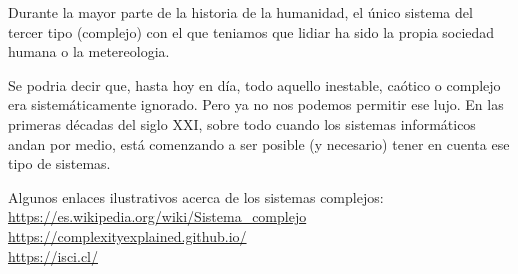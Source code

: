 \documentclass[10pt,a4paper]{article}
\begin{document}
Durante la mayor parte de la historia de la humanidad, el único sistema del tercer tipo (complejo) con el que teniamos que lidiar ha sido la propia sociedad humana o la metereologia. 

Se podria decir que, hasta hoy en día, todo aquello inestable, caótico o complejo era sistemáticamente ignorado. Pero ya no nos podemos permitir ese lujo. En las primeras décadas del siglo XXI, sobre todo cuando los sistemas informáticos andan por medio, está comenzando a ser posible (y necesario) tener en cuenta ese tipo de sistemas.

\hspace{1cm}

Algunos enlaces ilustrativos acerca de los sistemas complejos:
\\ \url{https://es.wikipedia.org/wiki/Sistema_complejo}
\\ \url{https://complexityexplained.github.io/}
\\ \url{https://isci.cl/}
\end{document}
